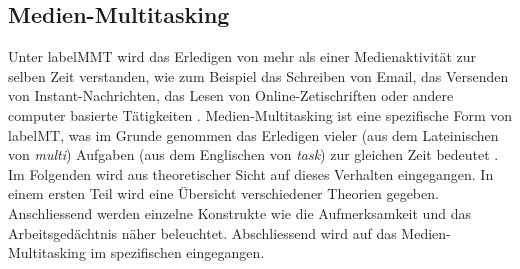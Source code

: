 \subsection{Medien-Multitasking}\label{subsection.medienMultitasking}
Unter \gls{labelMMT} wird das Erledigen von mehr als einer Medienaktivität zur selben Zeit verstanden, wie zum Beispiel das Schreiben von Email, das Versenden von Instant-Nachrichten, das Lesen von Online-Zetischriften oder andere computer basierte Tätigkeiten \cite{Foehr2006}. Medien-Multitasking ist eine spezifische Form von \gls{labelMT}, was im Grunde genommen das Erledigen vieler (aus dem Lateinischen von \textit{multi}) Aufgaben (aus dem Englischen von \textit{task}) zur gleichen Zeit bedeutet \cite{Spitzer2012}.  Im Folgenden wird aus theoretischer Sicht auf dieses Verhalten eingegangen. In einem ersten Teil wird eine Übersicht verschiedener Theorien gegeben. Anschliessend werden einzelne Konstrukte wie die Aufmerksamkeit und das Arbeitsgedächtnis näher beleuchtet. Abschliessend wird auf das Medien-Multitasking im spezifischen eingegangen.
\par
